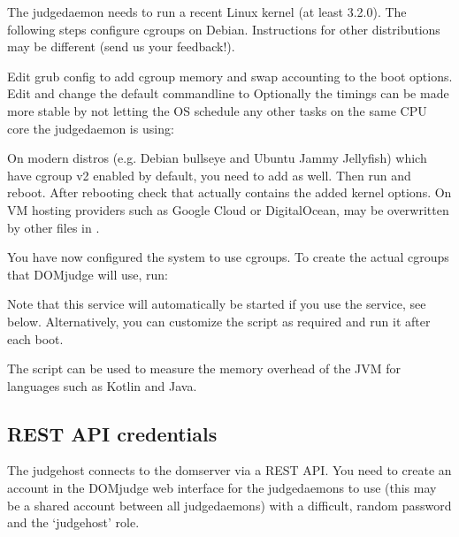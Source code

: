 \documentclass[a4paper,10pt,english,openany]{sphinxmanual}
\begin{document}
\sphinxAtStartPar
The judgedaemon needs to run a recent Linux kernel (at least 3.2.0). The
following steps configure cgroups on Debian. Instructions for other
distributions may be different (send us your feedback!).

\sphinxAtStartPar
Edit grub config to add cgroup memory and swap accounting to the boot
options. Edit  and change the default
commandline to
Optionally the timings can be made more stable by not letting the OS schedule
any other tasks on the same CPU core the judgedaemon is using:

\sphinxAtStartPar
On modern distros (e.g. Debian bullseye and Ubuntu Jammy Jellyfish) which have
cgroup v2 enabled by default, you need to add 
as well. Then run  and reboot.
After rebooting check that  actually contains the
added kernel options. On VM hosting providers such as Google Cloud or
DigitalOcean,  may be overwritten
by other files in .

\sphinxAtStartPar
You have now configured the system to use cgroups. To create
the actual cgroups that DOMjudge will use, run:

\begin{sphinxVerbatim}[commandchars=\\\{\}]
    
\end{sphinxVerbatim}

\sphinxAtStartPar
Note that this service will automatically be started if you use the
 service, see below. Alternatively, you can
customize the script  as required and run it
after each boot.

\sphinxAtStartPar
The script  can be used to measure the memory overhead of the JVM for languages such as Kotlin and Java.


\subsection{REST API credentials}
\label{\detokenize{install-judgehost:rest-api-credentials}}
\sphinxAtStartPar
The judgehost connects to the domserver via a REST API. You need to
create an account in the DOMjudge web interface for the judgedaemons
to use (this may be a shared account between all judgedaemons) with
a difficult, random password and the ‘judgehost’ role.
\end{document}
